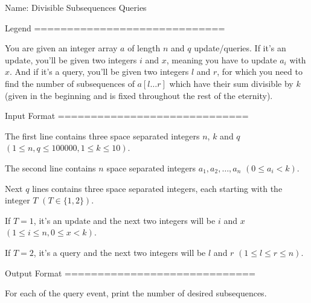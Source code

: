 Name: Divisible Subsequences Queries


Legend
=============================

You are given an integer array $a$ of length $n$ and $q$ update/queries. If
it's an update, you'll be given two integers $i$ and $x$, meaning you have to
update $a_i$ with $x$. And if it's a query, you'll be given two integers $l$
and $r$, for which you need to find the number of subsequences of $a[l\ldots
r]$ which have their sum divisible by $k$ (given in the beginning and is
fixed throughout the rest of the eternity).


Input Format
=============================

The first line contains three space separated integers $n$, $k$ and $q$ $(1
\le n, q \le 100000, 1 \le k \le 10)$.

The second line contains $n$ space separated integers $a_1, a_2, \ldots,
a_n$ $(0 \le a_i < k)$.

Next $q$ lines contains three space separated integers, each starting with
the integer $T$ $(T \in \{1, 2\})$.

If $T = 1$, it's an update and the next two integers will be $i$ and $x$ $(1
\le i \le n, 0 \le x < k)$.

If $T = 2$, it's a query and the next two integers will be $l$ and $r$ $(1
\le l \le r \le n)$.

Output Format
=============================

For each of the query event, print the number of desired subsequences.
